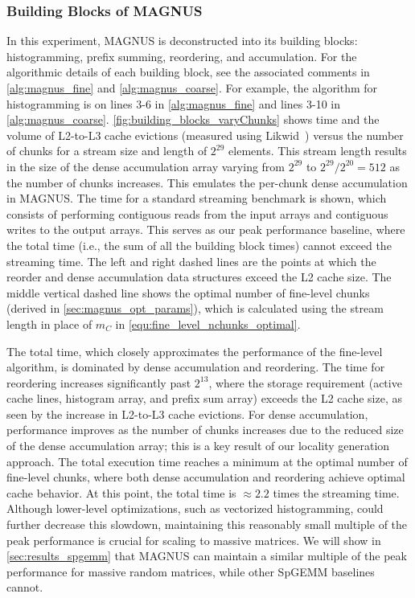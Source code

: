 \subsubsection{Building Blocks of MAGNUS}
In this experiment, MAGNUS is deconstructed into its building blocks: histogramming, prefix summing, reordering, and accumulation.
For the algorithmic details of each building block, see the associated comments in \autoref{alg:magnus_fine} and \autoref{alg:magnus_coarse}. For example, the algorithm for histogramming is on lines 3-6 in \autoref{alg:magnus_fine} and lines 3-10 in \autoref{alg:magnus_coarse}.
\autoref{fig:building_blocks_varyChunks} shows time and the volume of L2-to-L3 cache evictions (measured using Likwid~\cite{likwid}) versus the number of chunks for a stream size and length of $2^{29}$ elements.
This stream length results in the size of the dense accumulation array varying from $2^{29}$ to $2^{29}/2^{20} = 512$ as the number of chunks increases.
This emulates the per-chunk dense accumulation in MAGNUS.
The time for a standard streaming benchmark is shown, which consists of performing contiguous reads from the input arrays and contiguous writes to the output arrays.
This serves as our peak performance baseline, where the total time (i.e., the sum of all the building block times) cannot exceed the streaming time.
The left and right dashed lines are the points at which the reorder and dense accumulation data structures exceed the L2 cache size.
The middle vertical dashed line shows the optimal number of fine-level chunks (derived in \autoref{sec:magnus_opt_params}), which is calculated using the stream length in place of $m_C$ in \autoref{equ:fine_level_nchunks_optimal}.

The total time, which closely approximates the performance of the fine-level algorithm, is dominated by dense accumulation and reordering.
The time for reordering increases significantly past $2^{13}$, where the storage requirement (active cache lines, histogram array, and prefix sum array) exceeds the L2 cache size, as seen by the increase in L2-to-L3 cache evictions.
For dense accumulation, performance improves as the number of chunks increases due to the reduced size of the dense accumulation array; this is a key result of our locality generation approach.
The total execution time reaches a minimum at the optimal number of fine-level chunks, where both dense accumulation and reordering achieve optimal cache behavior. At this point, the total time is $\approx 2.2$ times the streaming time. Although lower-level optimizations, such as vectorized histogramming, could further decrease this slowdown, maintaining this reasonably small multiple of the peak performance is crucial for scaling to massive matrices.
We will show in \autoref{sec:results_spgemm} that MAGNUS can maintain a similar multiple of the peak performance for massive random matrices, while other SpGEMM baselines cannot.

